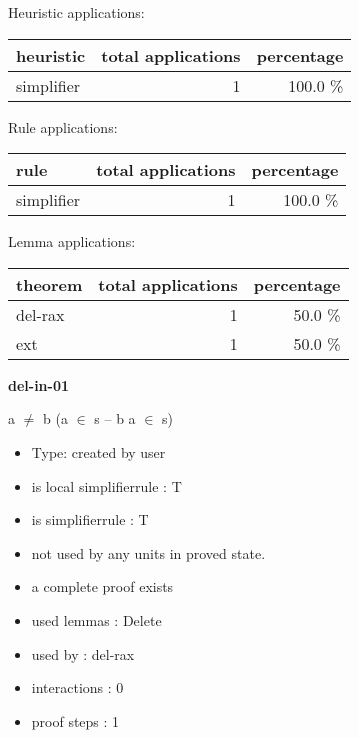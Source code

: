 \documentclass[a4paper]{article}
\begin{document}
\medskip


Heuristic applications:

\begin{supertabular}{l|r|r}
heuristic	& total applications & percentage \\ \hline
simplifier & 1 & 100.0 \% \\

\end{supertabular}

Rule applications:

\begin{supertabular}{l|r|r}
rule	        & total applications & percentage \\ \hline
simplifier & 1 & 100.0 \% \\

\end{supertabular}

Lemma applications:

\begin{supertabular}{l|r|r}
theorem	        & total applications & percentage \\ \hline
del-rax & 1 & 50.0 \% \\
ext & 1 & 50.0 \% \\

\end{supertabular}
\pagebreak

{\LARGE\bf del-in-01}\label{lemma-del-in-01}

\medskip

 \Fol a $\neq$ b \Imp (\Not a $\in$ s -- b \Equiv \Not a $\in$ s)

\begin{itemize}

\item Type: created by user

\item is local simplifierrule : T
\item is simplifierrule : T
\item not used by any units in proved state.
\item       a complete proof exists
\item       used lemmas  : Delete
\item       used by      : del-rax
\item       interactions : 0
\item       proof steps  : 1
\end{itemize}

\medskip
\end{document}
